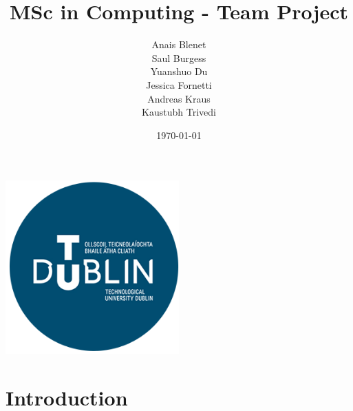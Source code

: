\documentclass{report}
\begin{document}
\includegraphics[width=0.5\textwidth]{Figures/tud_logo.png}
\title{MSc in Computing - Team Project}
\author{Anais Blenet\\Saul Burgess\\Yuanshuo Du\\Jessica Fornetti\\Andreas Kraus\\Kaustubh Trivedi}
\date{\today}

\renewcommand{\cfttoctitlefont}{\hfill\Huge\bfseries} %
\renewcommand{\cftaftertoctitle}{\hfill}

\maketitle %

\tableofcontents
\newpage

\chapter{Introduction}
\end{document}
